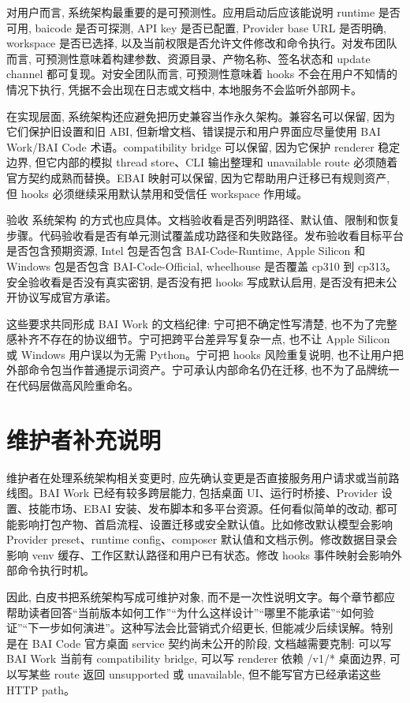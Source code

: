 对用户而言, 系统架构最重要的是可预测性。应用启动后应该能说明 runtime 是否可用, baicode 是否可探测, API key 是否已配置, Provider base URL 是否明确, workspace 是否已选择, 以及当前权限是否允许文件修改和命令执行。对发布团队而言, 可预测性意味着构建参数、资源目录、产物名称、签名状态和 update channel 都可复现。对安全团队而言, 可预测性意味着 hooks 不会在用户不知情的情况下执行, 凭据不会出现在日志或文档中, 本地服务不会监听外部网卡。

在实现层面, 系统架构还应避免把历史兼容当作永久架构。兼容名可以保留, 因为它们保护旧设置和旧 ABI, 但新增文档、错误提示和用户界面应尽量使用 BAI Work/BAI Code 术语。compatibility bridge 可以保留, 因为它保护 renderer 稳定边界, 但它内部的模拟 thread store、CLI 输出整理和 unavailable route 必须随着官方契约成熟而替换。EBAI 映射可以保留, 因为它帮助用户迁移已有规则资产, 但 hooks 必须继续采用默认禁用和受信任 workspace 作用域。

验收 系统架构 的方式也应具体。文档验收看是否列明路径、默认值、限制和恢复步骤。代码验收看是否有单元测试覆盖成功路径和失败路径。发布验收看目标平台是否包含预期资源, Intel 包是否包含 BAI-Code-Runtime, Apple Silicon 和 Windows 包是否包含 BAI-Code-Official, wheelhouse 是否覆盖 cp310 到 cp313。安全验收看是否没有真实密钥, 是否没有把 hooks 写成默认启用, 是否没有把未公开协议写成官方承诺。

这些要求共同形成 BAI Work 的文档纪律: 宁可把不确定性写清楚, 也不为了完整感补齐不存在的协议细节。宁可把跨平台差异写复杂一点, 也不让 Apple Silicon 或 Windows 用户误以为无需 Python。宁可把 hooks 风险重复说明, 也不让用户把外部命令包当作普通提示词资产。宁可承认内部命名仍在迁移, 也不为了品牌统一在代码层做高风险重命名。

\section{维护者补充说明}

维护者在处理系统架构相关变更时, 应先确认变更是否直接服务用户请求或当前路线图。BAI Work 已经有较多跨层能力, 包括桌面 UI、运行时桥接、Provider 设置、技能市场、EBAI 安装、发布脚本和多平台资源。任何看似简单的改动, 都可能影响打包产物、首启流程、设置迁移或安全默认值。比如修改默认模型会影响 Provider preset、runtime config、composer 默认值和文档示例。修改数据目录会影响 venv 缓存、工作区默认路径和用户已有状态。修改 hooks 事件映射会影响外部命令执行时机。

因此, 白皮书把系统架构写成可维护对象, 而不是一次性说明文字。每个章节都应帮助读者回答“当前版本如何工作”“为什么这样设计”“哪里不能承诺”“如何验证”“下一步如何演进”。这种写法会比营销式介绍更长, 但能减少后续误解。特别是在 BAI Code 官方桌面 service 契约尚未公开的阶段, 文档越需要克制: 可以写 BAI Work 当前有 compatibility bridge, 可以写 renderer 依赖 /v1/* 桌面边界, 可以写某些 route 返回 unsupported 或 unavailable, 但不能写官方已经承诺这些 HTTP path。

